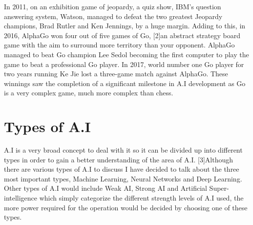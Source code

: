 \documentclass[letterpaper, 10 pt, conference]{ieeeconf}  %
\begin{document}
In 2011, on an exhibition game of jeopardy, a quiz show, IBM’s question answering system, Watson, managed to defeat the two greatest Jeopardy champions, Brad Rutler and Ken Jennings, by a huge margin. Adding to this, in 2016, AlphaGo won four out of five games of Go, [2]an abstract strategy board game with the aim to surround more territory than your opponent. AlphaGo managed to beat Go champion Lee Sedol becoming the first computer to play the game to beat a professional Go player. In 2017, world number one Go player for two years running Ke Jie lost a three-game match against AlphaGo. These winnings saw the completion of a significant milestone in A.I development as Go is a very complex game, much more complex than chess. 


\section{Types of A.I}

A.I is a very broad concept to deal with it so it can be divided up into different types in order to gain a better understanding of the area of A.I. [3]Although there are various types of A.I to discuss I have decided to talk about the three most important types, Machine Learning, Neural Networks and Deep Learning. Other types of A.I would include Weak AI, Strong AI and Artificial Super-intelligence which simply categorize the different strength levels of A.I used, the more power required for the operation would be decided by choosing one of these types. 
\end{document}
